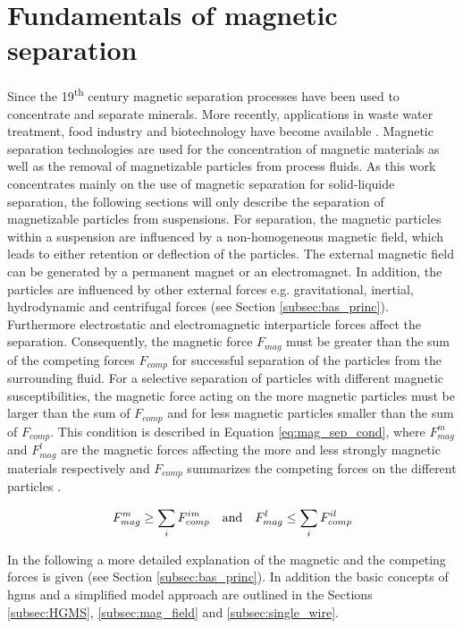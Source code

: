 \section{Fundamentals of magnetic separation}
\label{sec:Mag_sep}
Since the 19\textsuperscript{th} century magnetic separation processes have been used to concentrate and separate minerals. More recently, applications in waste water treatment, food industry and biotechnology have become available \cite{yavuz2009magnetic}. Magnetic separation technologies are used for the concentration of magnetic materials  as well as the removal of magnetizable particles from process fluids. As this work concentrates mainly on the use of magnetic separation for solid-liquide separation, the following sections will only describe the separation of magnetizable particles from suspensions. For separation, the magnetic particles within a suspension are influenced by a non-homogeneous magnetic field, which leads to either retention or deflection of the particles. The external magnetic field can be generated by a permanent magnet or an electromagnet. In addition, the particles are influenced by other external forces e.g. gravitational, inertial, hydrodynamic and centrifugal forces (see Section \ref{subsec:bas_princ}). Furthermore electrostatic and electromagnetic interparticle forces affect the separation. Consequently, the magnetic force $F_{mag}$ must be greater than the sum of the competing forces $F_{comp}$ for successful separation of the particles from the surrounding fluid. For a selective separation of particles with different magnetic susceptibilities, the magnetic force acting on the more magnetic particles must be larger than the sum of $F_{comp}$ and for less magnetic particles smaller than the sum of $F_{comp}$. This condition is described in Equation \ref{eq:mag_sep_cond}, where $F_{mag}^{m}$ and $F_{mag}^{l}$ are the magnetic forces affecting the more and less strongly magnetic materials respectively and $F_{comp}$ summarizes the competing forces on the different particles \cite{svoboda2004magnetic}\cite{oberteuffer1974magnetic}.   

\begin{equation}
\label{eq:mag_sep_cond}
\centering
F_{mag}^{m}\geq\sum_{i}F_{comp}^{im} \quad \textrm{and} \quad F_{mag}^{l}\leq\sum_{i}F_{comp}^{il}
\end{equation}

In the following a more detailed explanation of the magnetic and the competing forces is given (see Section \ref{subsec:bas_princ}). In addition the basic concepts of \gls{hgms} and a simplified model approach are outlined in the Sections \ref{subsec:HGMS}, \ref{subsec:mag_field} and \ref{subsec:single_wire}.  

